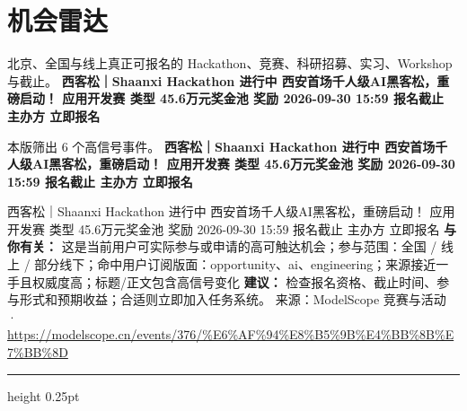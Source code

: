 \documentclass[10.5pt]{ctexart}
\begin{document}
\section*{机会雷达}
{\color{ormuted} 北京、全国与线上真正可报名的 Hackathon、竞赛、科研招募、实习、Workshop 与截止。}
\vspace{2mm}
{\LARGE\bfseries 西客松｜Shaanxi Hackathon 进行中 西安首场千人级AI黑客松，重磅启动！ 应用开发赛 类型 45.6万元奖金池 奖励 2026-09-30 15:59 报名截止 主办方 立即报名}\par
\vspace{1mm}
{\color{ormuted} 本版筛出 6 个高信号事件。}
\vspace{3mm}
{\Large\bfseries 西客松｜Shaanxi Hackathon 进行中 西安首场千人级AI黑客松，重磅启动！ 应用开发赛 类型 45.6万元奖金池 奖励 2026-09-30 15:59 报名截止 主办方 立即报名}\par
西客松｜Shaanxi Hackathon 进行中 西安首场千人级AI黑客松，重磅启动！ 应用开发赛 类型 45.6万元奖金池 奖励 2026-09-30 15:59 报名截止 主办方 立即报名
\textbf{与你有关：} 这是当前用户可实际参与或申请的高可触达机会；参与范围：全国 / 线上 / 部分线下；命中用户订阅版面：opportunity、ai、engineering；来源接近一手且权威度高；标题/正文包含高信号变化
\textbf{建议：} 检查报名资格、截止时间、参与形式和预期收益；合适则立即加入任务系统。
{\footnotesize\color{ormuted} 来源：ModelScope 竞赛与活动 · \url{https://modelscope.cn/events/376/%E6%AF%94%E8%B5%9B%E4%BB%8B%E7%BB%8D}}
\vspace{4mm}
\hrule height 0.25pt
\vspace{3mm}
\end{document}
